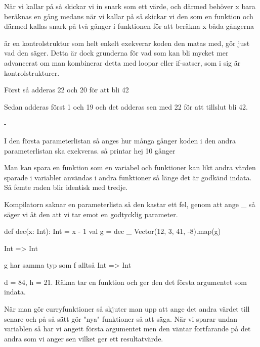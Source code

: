 \Subtask {}

\Subtask När vi kallar på  så skickar vi in snark som ett värde, och därmed behöver x bara beräknas en gång medans när vi kallar på  så skickar vi den som en funktion och därmed kallas snark på två gånger i funktionen för att beräkna x båda gångerna


\Subtask {} är en kontrolstruktur som helt enkelt exekverar koden den matas med,  gör just vad den säger. Detta är dock grunderna för vad som kan bli mycket mer advancerat om man kombinerar detta med loopar eller if-satser, som i sig är kontrolstrukturer.

\Task Först så adderas 22 och 20 för att bli 42

Sedan adderas först 1 och 19 och det adderas sen med 22 för att tillslut bli 42.

\Task

\Subtask -

\Subtask I den första parameterlistan så anges hur många gånger koden i den andra parameterlistan ska exekveras. så  printar hej 10 gånger

\Task

\Subtask Man kan spara en funktion som en variabel och funktioner kan likt andra värden sparade i variabler användas i andra funktioner så länge det är godkänd indata. Så femte raden blir identisk med tredje.

\Subtask Kompilatorn saknar en parameterlista så den kastar ett fel, genom att ange \_ så säger vi åt den att vi tar emot en godtycklig parameter.

\Subtask
\begin{REPLnonum}
def dec(x: Int): Int = x - 1
val g = dec _
Vector(12, 3, 41, -8).map(g)
\end{REPLnonum}

\Subtask Int => Int

g har samma typ som f alltså  Int => Int

\Subtask d = 84, h = 21. Räkna tar en funktion och ger den det första argumentet som indata.

\Task När man gör curryfunktioner så skjuter man upp att ange det andra värdet till senare och på så sätt gör "nya" funktioner så att säga. När vi sparar undan variablen  så har vi angett första argumentet men den väntar fortfarande på det andra som vi anger sen vilket ger ett resultatvärde.

